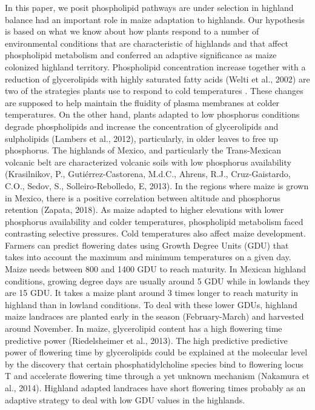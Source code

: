 \documentclass[9pt,twocolumn,twoside,lineno]{gsajnl}
\begin{document}
In this paper, we posit  phospholipid pathways are under selection in highland balance had an important role in maize adaptation to highlands.  
Our hypothesis is based on what we know about how plants respond to a number of environmental conditions that are characteristic of highlands and that affect phospholipid metabolism and conferred an adaptive significance as maize colonized highland territory. 
Phospholipid concentration increase \citep{Degenkolbe2012-wf} together with a reduction of glycerolipids with highly saturated fatty acids \citep{Welti2002-uk}(Welti et al., 2002) are two of the strategies plants use to respond to cold temperatures \cite{Lynch1987-ln}. 
These changes are supposed to help maintain the fluidity of plasma membranes at colder temperatures. On the other hand, plants adapted to low phosphorus conditions degrade phospholipids and increase the concentration of glycerolipids and sulpholipids (Lambers et al., 2012), particularly, in older leaves to free up phosphorus. 
The highlands of Mexico, and particularly the Trans-Mexican volcanic belt are characterized volcanic soils with low phosphorus availability (Krasilnikov, P., Gutiérrez-Castorena, M.d.C., Ahrens, R.J., Cruz-Gaistardo, C.O., Sedov, S., Solleiro-Rebolledo, E, 2013). 
In the regions where maize is grown in Mexico, there is a positive correlation between altitude and phosphorus retention (Zapata, 2018). 
As maize adapted to higher elevations with lower phosphorus availability and colder temperatures, phospholipid metabolism faced contrasting selective pressures. 
Cold temperatures also affect maize development. Farmers can predict flowering dates using Growth Degree Units (GDU) that takes into account the maximum and minimum temperatures on a given day. 
Maize needs between 800 and 1400 GDU to reach maturity. 
In Mexican highland conditions, growing degree days are usually around 5 GDU while in lowlands they are 15 GDU. 
It takes a maize plant around 3 times longer to reach maturity in highland than in lowland conditions. To deal with these lower GDUs, highland maize landraces are planted early in the season (February-March) and harvested around November. 
In maize, glycerolipid content has a high flowering time predictive power (Riedelsheimer et al., 2013). 
The high predictive predictive power of flowering time by glycerolipids could be explained at the molecular level by the discovery that certain phosphatidylcholine species bind to flowering locus T and accelerate flowering time through a yet unknown mechanism (Nakamura et al., 2014). 
Highland adapted landraces have short flowering times probably as an adaptive strategy to deal with low GDU values in the highlands.   
\end{document}
